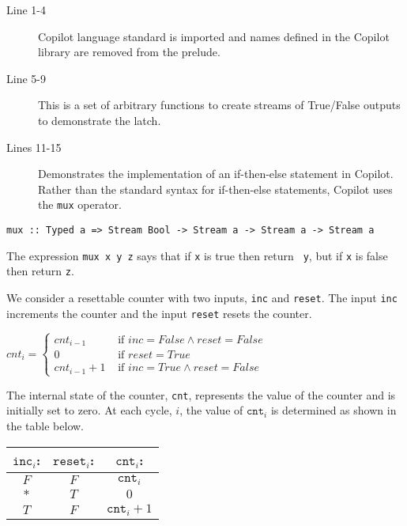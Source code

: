 \begin{description}
  \item[Line 1-4] Copilot language standard is imported  and names defined in the Copilot library are removed from the prelude.
  \item[Line 5-9] This is a set of arbitrary functions to create streams of
  True/False outputs to demonstrate the latch.
  \item[Lines 11-15] Demonstrates the implementation of an if-then-else statement in Copilot. Rather than the standard syntax for if-then-else statements, Copilot uses the {\tt mux} operator.
\end{description}

%
\begin{lstlisting}[language = Copilot, frame = single]
mux :: Typed a => Stream Bool -> Stream a -> Stream a -> Stream a
\end{lstlisting}
%

The expression {\tt mux x y z} says that if {\tt x} is true then return {\tt
y}, but if {\tt x} is false then return {\tt z}.

\begin{example} We consider a resettable counter with two inputs, {\tt inc} and
{\tt reset}.
%
The input {\tt inc} increments the counter and the input {\tt reset} resets the
counter.
%
\begin{center}
${cnt}_{i}=\begin{cases}
{cnt}_{i-1} & \text{ if } {inc} = False \wedge {reset} = False \\
0 & \text{ if } {reset} = True\\
{cnt}_{i-1} + 1 & \text { if } {inc} = True \wedge {reset} = False
\end{cases}$
\end{center} 
%
The internal state of the counter, {\tt cnt}, represents the value of the
counter and is initially set to zero. 
%
At each cycle, $i$, the value of $\mathtt{cnt}_i$ is determined as shown in the
table below.

\begin{center}
\begin{minipage}{0.25\linewidth}
\begin{tabular}{c|c||c}
$\mathtt{inc}_i$: & $\mathtt{reset}_i$: & $\mathtt{cnt}_i$:\\
\hline
$F$ & $F$ & $\mathtt{cnt}_{i}$ \\
\hline
$*$ & $T$ & $0$ \\
\hline
$T$ & $F$ & $\mathtt{cnt}_{i}+1$\\
\hline
\end{tabular}
\end{minipage}
\end{center}
\end{example}


